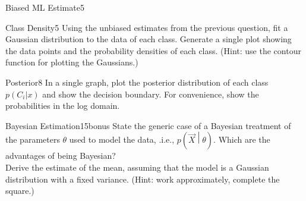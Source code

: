 \begin{questions}
\begin{question}{Biased ML Estimate}{5}
\begin{answer}
\end{answer}

\end{question}



\begin{question}{Class Density}{5}
Using the unbiased estimates from the previous question, fit a Gaussian distribution to the data of each class. Generate a single plot showing the data points and the probability densities of each class.
(Hint: use the contour function for plotting the Gaussians.) 

\begin{answer}

\end{answer}

\end{question}


\begin{question}{Posterior}{8}
In a single graph, plot the posterior distribution of each class $p(C_i|x)$ 
and show the decision boundary. For convenience, show the probabilities
in the log domain.

\begin{answer}

\end{answer}

\end{question}


\begin{question}{Bayesian Estimation}{15}{bonus}
State the generic case of a Bayesian treatment of the parameters $\theta$ used to model the data, .i.e., $p(\vec X \middle | \theta )$. 
Which are the advantages of being Bayesian? 
\\ Derive the estimate of the mean, assuming that the model is a Gaussian distribution with a fixed variance. (Hint: work approximately, complete the square.)


\begin{answer}
\end{answer}

\end{question}

\end{questions}

